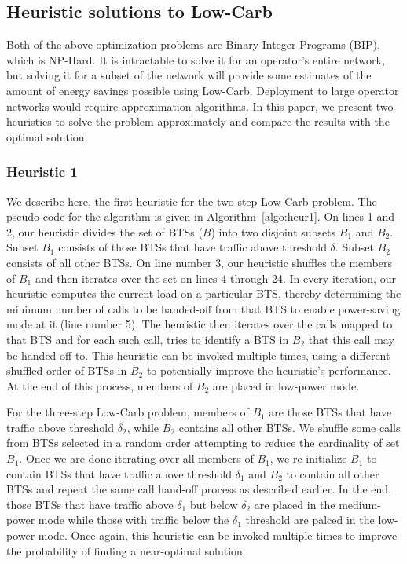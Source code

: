 \subsection{Heuristic solutions to Low-Carb}
\label{subsec:heuristics} Both of the above optimization problems are Binary Integer Programs
(BIP), which is NP-Hard. It is intractable to solve it for an
operator's entire network, but solving it for a subset of the
network will provide some estimates of the amount of energy
savings possible using Low-Carb. Deployment to large operator
networks would require approximation algorithms. In this paper, we present two heuristics to solve the problem approximately and compare the results with the optimal solution.

\subsubsection{Heuristic 1}
\label{subsubsec:heuristic1} We describe here, the first heuristic for the two-step Low-Carb problem. The pseudo-code for the algorithm is given in Algorithm~\ref{algo:heur1}. On lines 1 and 2, our heuristic divides the set of BTSs ($B$) into two disjoint subsets $B_1$ and $B_2$. Subset $B_1$ consists of those BTSs that have traffic above threshold $\delta$. Subset $B_2$ consists of all other BTSs. On line number 3, our heuristic shuffles the members of $B_1$ and then iterates over the set on lines 4 through 24. In every iteration, our heuristic computes the current load on a particular BTS, thereby determining the minimum number of calls to be handed-off from that BTS to enable power-saving mode at it (line number 5). The heuristic then iterates over the calls mapped to that BTS and for each such call, tries to identify a BTS in $B_2$ that this call may be handed off to. This heuristic can be invoked multiple times, using a different shuffled order of BTSs in $B_2$ to potentially improve the heuristic's performance. At the end of this process, members of $B_2$ are placed in low-power mode. 


For the three-step Low-Carb problem, members of $B_1$ are those BTSs that have traffic above threshold $\delta_2$, while $B_2$ contains all other BTSs. We shuffle some calls from BTSs selected in a random order attempting to reduce the cardinality of set $B_1$. Once we are done iterating over all members of $B_1$, we re-initialize $B_1$ to contain BTSs that have traffic above threshold $\delta_1$ and $B_2$ to contain all other BTSs and repeat the same call hand-off process as described earlier. In the end, those BTSs that have traffic above $\delta_1$ but below $\delta_2$ are placed in the medium-power mode while those with traffic below the $\delta_1$ threshold are palced in the low-power mode. Once again, this heuristic can be invoked multiple times to improve the probability of finding a near-optimal solution.

